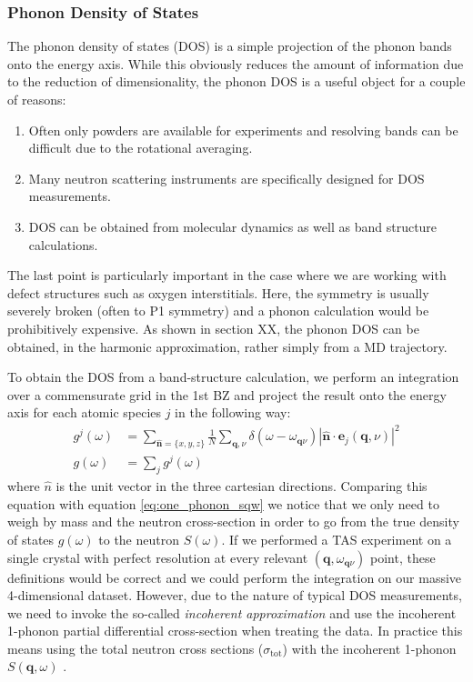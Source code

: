 \subsubsection{Phonon Density of States}
The phonon density of states (DOS) is a simple projection of the phonon bands onto the energy axis. While this obviously reduces the amount of information due to the reduction of dimensionality, the phonon DOS is a useful object for a couple of reasons:

\begin{enumerate}
	\item Often only powders are available for experiments and resolving bands can be difficult due to the rotational averaging.
	\item Many neutron scattering instruments are specifically designed for DOS measurements.
	\item DOS can be obtained from molecular dynamics as well as band structure calculations.
\end{enumerate}

\noindent The last point is particularly important in the case where we are working with defect structures such as oxygen interstitials. Here, the symmetry is usually severely broken (often to P1 symmetry) and a phonon calculation would be prohibitively expensive. As shown in section XX, the phonon DOS can be obtained, in the harmonic approximation, rather simply from a MD trajectory.

To obtain the DOS from a band-structure calculation, we perform an integration over a commensurate grid in the 1st BZ and project the result onto the energy axis for each atomic species $j$ in the following way:
%
\begin{align*}
	g^j (\omega) &= \sum_{\bm{\hat{n}}=\{x,y,z\}} \frac{1}{N} \sum_{\bm{q},\nu} \delta(\omega - \omega_{\bm{q}\nu}) \left| \bm{\hat{n}} \cdot \bm{e}_j(\bm{q},\nu) \right| ^2 \\
	g(\omega) &= \sum_j g^j(\omega)
\end{align*}
%
where $\hat{n}$ is the unit vector in the three cartesian directions. Comparing this equation with equation \eqref{eq:one_phonon_sqw} we notice that we only need to weigh by mass and the neutron cross-section in order to go from the true density of states $g(\omega)$ to the neutron $S(\omega)$. If we performed a TAS experiment on a single crystal with perfect resolution at every relevant $(\bm{q},\omega_{\bm{q}\nu})$ point, these definitions would be correct and we could perform the integration on our massive 4-dimensional dataset. However, due to the nature of typical DOS measurements, we need to invoke the so-called \emph{incoherent approximation} and use the incoherent 1-phonon partial differential cross-section when treating the data. In practice this means using the total neutron cross sections ($\sigma_\text{tot}$) with the incoherent 1-phonon $S(\bm{q},\omega)$ .

